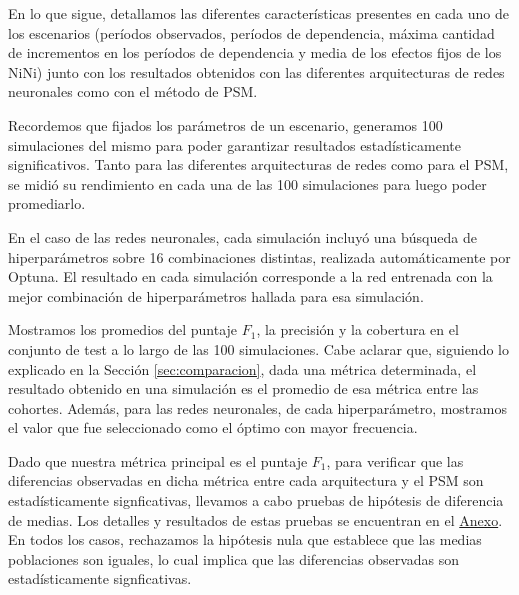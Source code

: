 \documentclass[../../main.tex]{subfiles}
\begin{document}
En lo que sigue, detallamos las diferentes características presentes en cada uno de los
escenarios (períodos observados, períodos de dependencia, máxima cantidad de incrementos
en los períodos de dependencia y media de los efectos fijos de los NiNi) junto con los
resultados obtenidos con las diferentes arquitecturas de redes neuronales como con el
método de PSM.

Recordemos que fijados los parámetros de un escenario, generamos 100 simulaciones
del mismo para poder garantizar resultados estadísticamente significativos. Tanto para
las diferentes arquitecturas de redes como para el PSM, se midió su rendimiento en
cada una de las 100 simulaciones para luego poder promediarlo.

En el caso de las redes neuronales, cada simulación incluyó una búsqueda de
hiperparámetros sobre 16 combinaciones distintas, realizada automáticamente por Optuna. El
resultado en cada simulación corresponde a la red entrenada con la mejor combinación de
hiperparámetros hallada para esa simulación.

Mostramos los promedios del puntaje \(F_1\), la precisión y la cobertura en el conjunto
de test a lo largo de las 100 simulaciones. Cabe aclarar que, siguiendo lo explicado en la
Sección \ref{sec:comparacion}, dada una métrica determinada, el resultado obtenido en una
simulación es el promedio de esa métrica entre las cohortes. Además, para las redes
neuronales, de cada hiperparámetro, mostramos el valor que fue seleccionado como el óptimo
con mayor frecuencia.

Dado que nuestra métrica principal es el puntaje \(F_1\), para verificar que las
diferencias observadas en dicha métrica entre cada arquitectura y el PSM son
estadísticamente signficativas, llevamos a cabo pruebas de hipótesis de diferencia de
medias. Los detalles y resultados de estas pruebas se encuentran en el
\hyperref[chap:anexo]{Anexo}. En todos los casos, rechazamos la hipótesis nula que
establece que las medias poblaciones son iguales, lo cual implica que las diferencias
observadas son estadísticamente signficativas.

\end{document}
